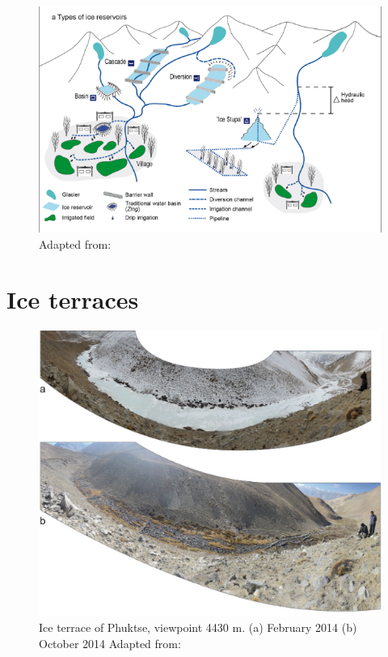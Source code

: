 \begin{figure}[htb]
\centering
\includegraphics[width=12cm]{figs/AIR_designs.png}
\caption{Adapted from: \cite{nusserSociohydrologyArtificialGlaciers2019}}
\label{fig:AIRdesigns}
\end{figure}

\section{Ice terraces}

\begin{figure}[t]
\centering
\includegraphics[width=12cm]{figs/IT_example.png}

\caption{Ice terrace of Phuktse, viewpoint 4430 m. (a) February 2014 (b) October 2014 Adapted from: \cite{nusserSociohydrologyArtificialGlaciers2019}}

\label{fig:ITexample}
\end{figure}

